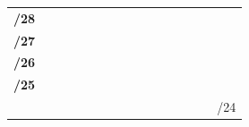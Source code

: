 \documentclass[11pt,a4paper]{report}
\begin{document}
\begin{longtable}[c]{rcccccccccccccccc}
        \textbf{/28}                                                                               &                               &                                &                                &                               &                                &                               & \cellcolor[HTML]{BFBFBF}       & \cellcolor[HTML]{BFBFBF}      &                             &                             &                             &                             &                             &                             &                             &                             \\
        \textbf{/27}                                                                               &                               &                                &                                &                               & \cellcolor[HTML]{FFD966}       & \cellcolor[HTML]{FFD966}      &                                &                               &                             &                             &                             &                             &                             &                             &                             &                             \\
        \textbf{/26}                                                                               &                               &                                & \cellcolor[HTML]{A9D08E}       & \cellcolor[HTML]{A9D08E}      &                                &                               &                                &                               &                             &                             &                             &                             &                             &                             &                             &                             \\
        \textbf{/25}                                                                               & \cellcolor[HTML]{F4B084}      & \cellcolor[HTML]{F4B084}       &                                &                               &                                &                               &                                &                               &                             &                             &                             &                             &                             &                             &                             &                             \\ \hline
                                                                                                   & \multicolumn{16}{r}{\cellcolor[HTML]{00B0F0}/24}                                                                                                                                                                                                                                                                                                                                                                                                                                                                  \\

\end{longtable}
\end{document}
